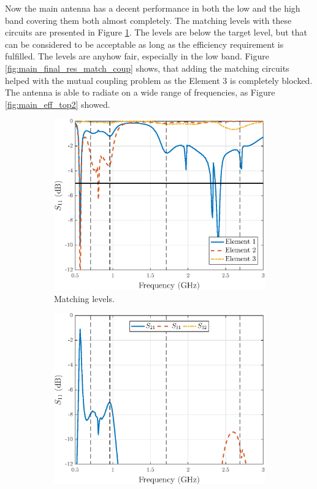 Now the main antenna has a decent performance in both the low and the high band covering them both almost completely. The matching levels with these circuits are presented in Figure \ref{fig:main_final_res_match}. The levels are below the target level, but that can be considered to be acceptable as long as the efficiency requirement is fulfilled. The levels are anyhow fair, especially in the low band. Figure \ref{fig:main_final_res_match_coup} shows, that adding the matching circuits helped with the mutual coupling problem as the Element 3 is completely blocked. The antenna is able to radiate on a wide range of frequencies, as Figure \ref{fig:main_eff_top2} showed.  
\begin{figure}[H]
    \centering
    \begin{subfigure}[b]{0.49\textwidth}
        \includegraphics[width=\textwidth]{img/main_final_res_match.eps}
        \caption{Matching levels.}
        \label{fig:main_final_res_match}
    \end{subfigure}
    \begin{subfigure}[b]{0.49\textwidth}
        \includegraphics[width=\textwidth]{img/main_final_res_match_coup.eps}

\end{subfigure}
\end{figure}
